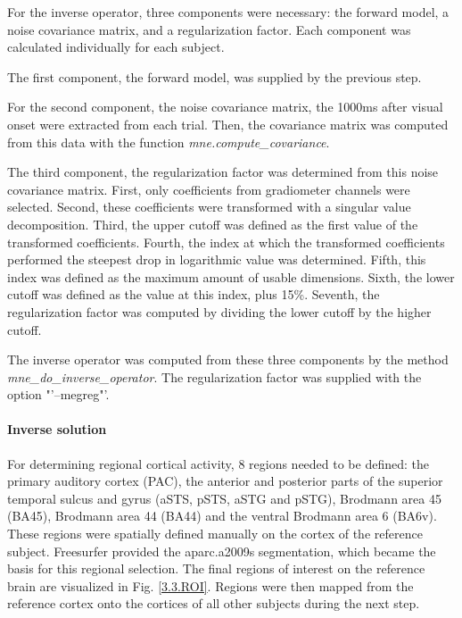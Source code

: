 For the inverse operator, three components were necessary: the forward model, a noise covariance matrix, and a regularization factor.
Each component was calculated individually for each subject.

The first component, the forward model, was supplied by the previous step.

For the second component, the noise covariance matrix, the 1000ms after visual onset were extracted from each trial.
Then, the covariance matrix was computed from this data with the function \emph{mne.compute\_covariance}.

The third component, the regularization factor was determined from this noise covariance matrix.
First, only coefficients from gradiometer channels were selected.
Second, these coefficients were transformed with a singular value decomposition.
Third, the upper cutoff was defined as the first value of the transformed coefficients.
Fourth, the index at which the transformed coefficients performed the steepest drop in logarithmic value was determined.
Fifth, this index was defined as the maximum amount of usable dimensions.
Sixth, the lower cutoff was defined as the value at this index, plus 15\%.
Seventh, the regularization factor was computed by dividing the lower cutoff by the higher cutoff.


The inverse operator was computed from these three components by the method \linebreak \emph{mne\_do\_inverse\_operator}.
The regularization factor was supplied with the option \linebreak "'--megreg"'.

\paragraph{Inverse solution}
For determining regional cortical activity, 8 regions needed to be defined: the primary auditory cortex (PAC), the anterior and posterior parts of the superior temporal sulcus and gyrus (aSTS, pSTS, aSTG and pSTG), Brodmann area 45 (BA45), Brodmann area 44 (BA44) and the ventral Brodmann area 6 (BA6v).
These regions were spatially defined manually on the cortex of the reference subject.
Freesurfer provided the aparc.a2009s segmentation, which became the basis for this regional selection.
The final regions of interest on the reference brain are visualized in Fig. \ref{3.3.ROI}.
Regions were then mapped from the reference cortex onto the cortices of all other subjects during the next step.

